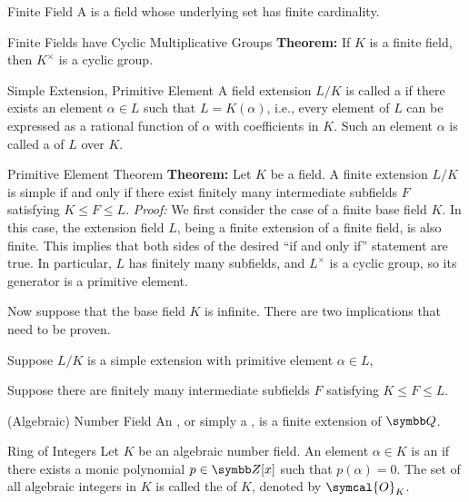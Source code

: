 \documentclass[12pt]{report}
\begin{document}
\begin{dfnbox}{Finite Field}
	A  is a field whose underlying set has finite cardinality.
\end{dfnbox}

\begin{thmbox}{Finite Fields have Cyclic Multiplicative Groups}
	\textbf{Theorem:} If $K$ is a finite field, then $K^\times$ is a cyclic group.
\end{thmbox}

\begin{dfnbox}{Simple Extension, Primitive Element}
	A field extension $L/K$ is called a  if there exists an element $\alpha \in L$ such that $L = K(\alpha)$, i.e., every element of $L$ can be expressed as a rational function of $\alpha$ with coefficients in $K$. Such an element $\alpha$ is called a  of $L$ over $K$.
\end{dfnbox}

\begin{thmbox}{Primitive Element Theorem}
	\textbf{Theorem:} Let $K$ be a field. A finite extension $L/K$ is simple if and only if there exist finitely many intermediate subfields $F$ satisfying $K \le F \le L$.
\tcblower
	\textit{Proof:} We first consider the case of a finite base field $K$. In this case, the extension field $L$, being a finite extension of a finite field, is also finite. This implies that both sides of the desired ``if and only if'' statement are true. In particular, $L$ has finitely many subfields, and $L^\times$ is a cyclic group, so its generator is a primitive element.

	Now suppose that the base field $K$ is infinite. There are two implications that need to be proven.
	\begin{dfnitems}
		\item Suppose $L/K$ is a simple extension with primitive element $\alpha \in L$,
		\item Suppose there are finitely many intermediate subfields $F$ satisfying $K \le F \le L$.
	\end{dfnitems}
\end{thmbox}

\begin{dfnbox}{(Algebraic) Number Field}
	An , or simply a , is a finite extension of $\Q$.
\end{dfnbox}

\begin{dfnbox}{Ring of Integers}
	Let $K$ be an algebraic number field. An element $\alpha \in K$ is an  if there exists a monic polynomial $p \in \Z[x]$ such that $p(\alpha) = 0$. The set of all algebraic integers in $K$ is called the  of $K$, denoted by $\symcal{O}_K$.
\end{dfnbox}
\end{document}
